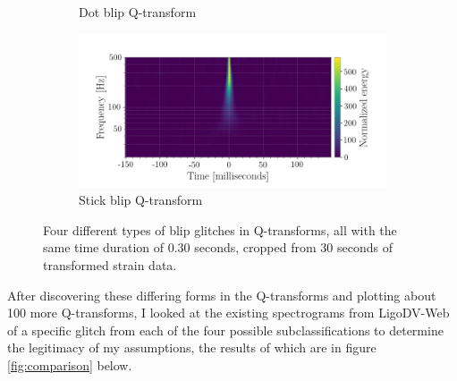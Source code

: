 \documentclass[a4paper]{article}
\begin{document}
\begin{figure}[h!]
\begin{subfigure}{.49\textwidth}
		\caption{Dot blip Q-transform}
		\label{fig:dot}
	\end{subfigure}
	\begin{subfigure}{.49\textwidth}
		\centering
		\includegraphics[width=1\linewidth]{stick_blip}
		\caption{Stick blip Q-transform}
		\label{fig:stick}
	\end{subfigure}
	\caption{Four different types of blip glitches in Q-transforms, all with the same time duration of 0.30 seconds, cropped from 30 seconds of transformed strain data.}
	\label{fig:q_transforms}
\end{figure}

After discovering these differing forms in the Q-transforms and plotting about 100 more Q-transforms, I looked at the existing spectrograms from LigoDV-Web of a specific glitch from each of the four possible subclassifications to determine the legitimacy of my assumptions, the results of which are in figure \ref{fig:comparison} below. 
\end{document}
